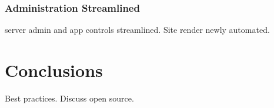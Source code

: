 \documentclass[10pt]{report}
\begin{document}
\subsection{Administration Streamlined}
server admin and app controls streamlined. Site render newly automated.




\chapter{Conclusions}

Best practices. Discuss open source.

\printbibliography{}
\end{document}
